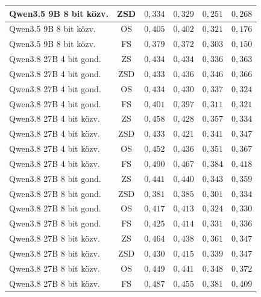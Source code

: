 \documentclass[
]{elteikthesis}[2024/04/26]
\begin{document}
\begin{longtable}{ | l | c | r | r | r | r | }
	\hline
	Qwen3.5 9B 8 bit közv. & ZSD & $0{,}334$ & $0{,}329$ & $0{,}251$ & $0{,}268$ \\
	\hline
	Qwen3.5 9B 8 bit közv. & OS & $0{,}405$ & $0{,}402$ & $0{,}321$ & $0{,}176$ \\
	\hline
	Qwen3.5 9B 8 bit közv. & FS & $0{,}379$ & $0{,}372$ & $0{,}303$ & $0{,}150$ \\
	\hline
	Qwen3.8 27B 4 bit gond. & ZS & $0{,}434$ & $0{,}434$ & $0{,}336$ & $0{,}363$ \\
	\hline
	Qwen3.8 27B 4 bit gond. & ZSD & $0{,}433$ & $0{,}436$ & $0{,}346$ & $0{,}366$ \\
	\hline
	Qwen3.8 27B 4 bit gond. & OS & $0{,}434$ & $0{,}430$ & $0{,}337$ & $0{,}324$ \\
	\hline
	Qwen3.8 27B 4 bit gond. & FS & $0{,}401$ & $0{,}397$ & $0{,}311$ & $0{,}321$ \\
	\hline
	Qwen3.8 27B 4 bit közv. & ZS & $0{,}458$ & $0{,}428$ & $0{,}357$ & $0{,}334$ \\
	\hline
	Qwen3.8 27B 4 bit közv. & ZSD & $0{,}433$ & $0{,}421$ & $0{,}341$ & $0{,}347$ \\
	\hline
	Qwen3.8 27B 4 bit közv. & OS & $0{,}452$ & $0{,}436$ & $0{,}351$ & $0{,}367$ \\
	\hline
	Qwen3.8 27B 4 bit közv. & FS & $0{,}490$ & $0{,}467$ & $0{,}384$ & $0{,}418$ \\
	\hline
	Qwen3.8 27B 8 bit gond. & ZS & $0{,}441$ & $0{,}440$ & $0{,}343$ & $0{,}359$ \\
	\hline
	Qwen3.8 27B 8 bit gond. & ZSD & $0{,}381$ & $0{,}385$ & $0{,}301$ & $0{,}334$ \\
	\hline
	Qwen3.8 27B 8 bit gond. & OS & $0{,}417$ & $0{,}413$ & $0{,}324$ & $0{,}330$ \\
	\hline
	Qwen3.8 27B 8 bit gond. & FS & $0{,}425$ & $0{,}414$ & $0{,}331$ & $0{,}336$ \\
	\hline
	Qwen3.8 27B 8 bit közv. & ZS & $0{,}464$ & $0{,}438$ & $0{,}361$ & $0{,}347$ \\
	\hline
	Qwen3.8 27B 8 bit közv. & ZSD & $0{,}430$ & $0{,}415$ & $0{,}339$ & $0{,}347$ \\
	\hline
	Qwen3.8 27B 8 bit közv. & OS & $0{,}449$ & $0{,}441$ & $0{,}348$ & $0{,}372$ \\
	\hline
	Qwen3.8 27B 8 bit közv. & FS & $0{,}487$ & $0{,}455$ & $0{,}381$ & $0{,}409$ \\
	\hline
\end{longtable}
\end{document}

